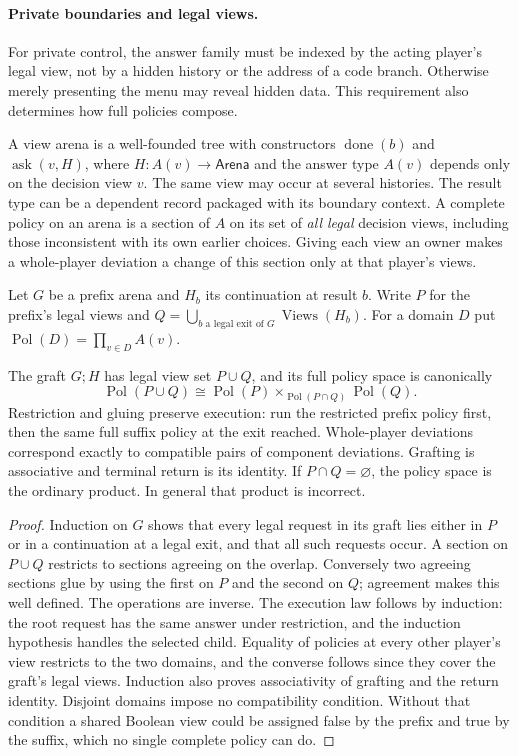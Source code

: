\paragraph{Private boundaries and legal views.}
For private control, the answer family must be indexed by the acting
player's legal view, not by a hidden history or the address of a
code branch. Otherwise merely presenting the menu may reveal hidden
data. This requirement also determines how full policies compose.

A view arena is a well-founded tree with constructors $\operatorname{done}(b)$
and $\operatorname{ask}(v,H)$, where $H:A(v)\to\mathsf{Arena}$ and the
answer type $A(v)$ depends only on the decision view $v$. The same
view may occur at several histories. The result type can be a dependent
record packaged with its boundary context. A complete policy on an
arena is a section of $A$ on its set of \emph{all legal} decision views,
including those inconsistent with its own earlier choices. Giving each
view an owner makes a whole-player deviation a change of this section
only at that player's views.

Let $G$ be a prefix arena and $H_b$ its continuation at result $b$.
Write $P$ for the prefix's legal views and
$Q=\bigcup_{b\text{ a legal exit of }G}\operatorname{Views}(H_b)$.
For a domain $D$ put
$\operatorname{Pol}(D)=\prod_{v\in D}A(v)$.

\begin{theorem}\label{dep:thm:dynamic-gluing}
The graft $G;H$ has legal view set $P\cup Q$, and its full policy
space is canonically
\[
 \operatorname{Pol}(P\cup Q)\cong
 \operatorname{Pol}(P)\mathbin{\times}_{\operatorname{Pol}(P\cap Q)}
 \operatorname{Pol}(Q).
\]
Restriction and gluing preserve execution: run the restricted prefix
policy first, then the same full suffix policy at the exit reached.
Whole-player deviations correspond exactly to compatible pairs of
component deviations. Grafting is associative and terminal return
is its identity. If $P\cap Q=\varnothing$, the policy space is the
ordinary product. In general that product is incorrect.
\end{theorem}
\begin{proof}
Induction on $G$ shows that every legal request in its graft lies
either in $P$ or in a continuation at a legal exit, and that all such
requests occur. A section on $P\cup Q$ restricts to sections agreeing
on the overlap. Conversely two agreeing sections glue by using the
first on $P$ and the second on $Q$; agreement makes this well defined.
The operations are inverse. The execution law follows by induction:
the root request has the same answer under restriction, and the
induction hypothesis handles the selected child. Equality of policies
at every other player's view restricts to the two domains, and the
converse follows since they cover the graft's legal views. Induction
also proves associativity of grafting and the return identity.
Disjoint domains impose no compatibility condition. Without that
condition a shared Boolean view could be assigned false by the
prefix and true by the suffix, which no single complete policy can do.
\end{proof}

